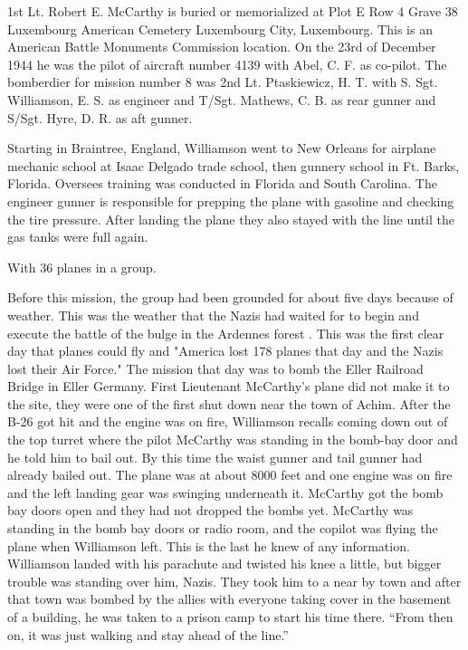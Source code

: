\documentclass{article}
\begin{document}
\begin{multicols}{3}
\closearticle


1st Lt. Robert E. McCarthy is buried or memorialized at Plot E Row 4 Grave 38 Luxembourg American Cemetery Luxembourg City, Luxembourg. This is an American Battle Monuments Commission location.
On the 23rd of December 1944 he was the pilot of aircraft number 4139 with Abel, C. F. as co-pilot. The bomberdier for mission number 8 was 2nd Lt. Ptaskiewicz, H. T. with S. Sgt. Williamson, E. S. as engineer and T/Sgt. Mathews, C. B. as rear gunner and S/Sgt. Hyre, D. R. as aft gunner. 


Starting in Braintree, England, Williamson went to New Orleans for airplane mechanic school at Isaac Delgado trade school, then gunnery school in Ft. Barks, Florida. Oversees training was conducted in Florida and South Carolina. The engineer gunner is responsible for prepping the plane with gasoline and checking the tire pressure. After landing the plane they also stayed with the line until the gas tanks were full again. 

With 36 planes in a group.

Before this mission, the group had been grounded for about five days because of weather. This was the weather that the Nazis had waited for to begin and execute the battle of the bulge in the Ardennes forest . This was the first clear day that planes could fly and "America lost 178 planes that day and the Nazis lost their Air Force." The mission that day was to bomb the Eller Railroad Bridge in Eller Germany. First Lieutenant McCarthy's plane did not make it to the site, they were one of the first shut down near the town of Achim. After the B-26 got hit and the engine was on fire, Williamson recalls coming down out of the top turret where the pilot McCarthy was standing in the bomb-bay door and he told him to bail out. By this time the waist gunner and tail gunner had already bailed out. The plane was at about 8000 feet and one engine was on fire and the left landing gear was swinging underneath it. McCarthy got the bomb bay doors open and they had not dropped the bombs yet. McCarthy was standing in the bomb bay doors or radio room, and the copilot was flying the plane when Williamson left. This is the last he knew of any information. Williamson landed with his parachute and twisted his knee a little, but bigger trouble was standing over him, Nazis. They took him to a near by town and after that town was bombed by the allies with everyone taking cover in the basement of a building, he was taken to a prison camp to start his time there. ``From then on, it was just walking and stay ahead of the line.''


\end{multicols}
\end{document}
